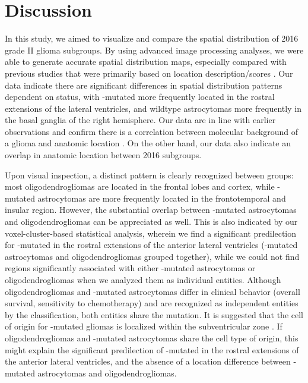 \section{Discussion}
In this study, we aimed to visualize and compare the spatial distribution of  2016 grade II glioma subgroups.
By using advanced image processing analyses, we were able to generate accurate spatial distribution maps, especially compared with previous studies that were primarily based on location description/scores \autocite{stockhammer2012idh1, goze2009lack, laigle2004correlations, metellus2010absence}.
Our data indicate there are significant differences in spatial distribution patterns dependent on  status, with -mutated  more frequently located in the rostral extensions of the lateral ventricles, and  wildtype astrocytomas more frequently in the basal ganglia of the right hemisphere.
Our data are in line with earlier observations and confirm there is a correlation between molecular background of a glioma and anatomic location \autocite{stockhammer2012idh1, goze2009lack, laigle2004correlations, metellus2010absence, tejada2018voxel}.
On the other hand, our data also indicate an overlap in anatomic location between  2016 subgroups.

Upon visual inspection, a distinct pattern is clearly recognized between groups: most oligodendrogliomas are located in the frontal lobes and cortex, while -mutated astrocytomas are more frequently located in the frontotemporal and insular region.
However, the substantial overlap between -mutated astrocytomas and oligodendrogliomas can be appreciated as well.
This is also indicated by our voxel-cluster-based statistical analysis, wherein we find a significant predilection for -mutated  in the rostral extensions of the anterior lateral ventricles (-mutated astrocytomas and oligodendrogliomas grouped together), while we could not find regions significantly associated with either -mutated astrocytomas or oligodendrogliomas when we analyzed them as individual entities.
Although oligodendrogliomas and -mutated astrocytomas differ in clinical behavior (overall survival, sensitivity to chemotherapy) and are recognized as independent entities by the  classification, both entities share the  mutation.
It is suggested that the cell of origin for -mutated gliomas is localized within the subventricular zone \autocite{sanai2005neural}.
If oligodendrogliomas and -mutated astrocytomas share the cell type of origin, this might explain the significant predilection of -mutated  in the rostral extensions of the anterior lateral ventricles, and the absence of a location difference between -mutated astrocytomas and oligodendrogliomas.

